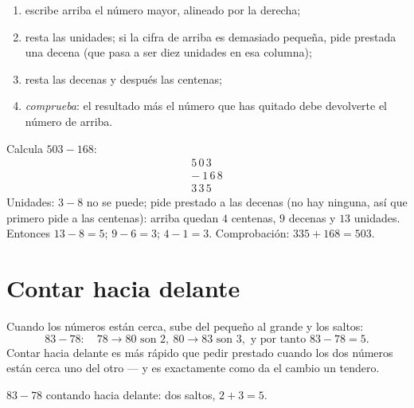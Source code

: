 \begin{method}\label{met:g2:subtraction:column}
\begin{enumerate}
  \item escribe arriba el número mayor, alineado por la derecha;
  \item resta las unidades; si la cifra de arriba es demasiado pequeña, pide
        prestada una decena (que pasa a ser diez unidades en esa columna);
  \item resta las decenas y después las centenas;
  \item \emph{comprueba}: el resultado más el número que has quitado debe
        devolverte el número de arriba.
\end{enumerate}
\end{method}

\begin{example}\label{ex:g2:subtraction:worked}
Calcula $503 - 168$:
\[
\begin{array}{r}
5\,0\,3 \\
-\ 1\,6\,8 \\
\hline
3\,3\,5
\end{array}
\]
Unidades: $3 - 8$ no se puede; pide prestado a las decenas (no hay ninguna,
así que primero pide a las centenas): arriba quedan $4$ centenas,
$9$ decenas y $13$ unidades. Entonces $13 - 8 = 5$; $9 - 6 = 3$;
$4 - 1 = 3$. Comprobación: $335 + 168 = 503$. \checkmark
\end{example}

\section{Contar hacia delante}

\begin{method}\label{met:g2:subtraction:countup}
Cuando los números están cerca, sube del pequeño al
grande y  los saltos:
\[
83 - 78: \quad 78 \to 80 \text{ son } 2, \ 80 \to 83 \text{ son } 3,
\text{ y por tanto } 83 - 78 = 5 .
\]
Contar hacia delante es más rápido que pedir prestado cuando los dos números están
cerca uno del otro --- y es exactamente como da el cambio un tendero.
\end{method}

\begin{omfigure}

{\small $83 - 78$ contando hacia delante: dos saltos, $2 + 3 = 5$.}
\end{omfigure}

